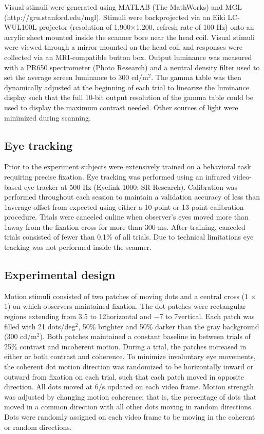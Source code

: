 \documentclass{report}
\begin{document}
Visual stimuli were generated using MATLAB (The MathWorks) and MGL \citep{Gardner2018-uq} (http://gru.stanford.edu/mgl). Stimuli were backprojected via an Eiki LC-WUL100L projector (resolution of 1,900×1,200, refresh rate of 100 Hz) onto an acrylic sheet mounted inside the scanner bore near the head coil. Visual stimuli were viewed through a mirror mounted on the head coil and responses were collected via an MRI-compatible button box. Output luminance was measured with a PR650 spectrometer (Photo Research) and a neutral density filter used to set the average screen luminance to 300 cd/m$^2$. The gamma table was then dynamically adjusted at the beginning of each trial to linearize the luminance display such that the full 10-bit output resolution of the gamma table could be used to display the maximum contrast needed. Other sources of light were minimized during scanning.

\subsection{Eye tracking}

Prior to the experiment subjects were extensively trained on a behavioral task requiring precise fixation. Eye tracking was performed using an infrared video-based eye-tracker at 500 Hz (Eyelink 1000; SR Research). Calibration was performed throughout each session to maintain a validation accuracy of less than 1\degree  average offset from expected using either a 10-point or 13-point calibration procedure. Trials were canceled online when observer’s eyes moved more than 1\degree  away from the fixation cross for more than 300 ms. After training, canceled trials consisted of fewer than 0.1\% of all trials. Due to technical limitations eye tracking was not performed inside the scanner.

\subsection{Experimental design}

Motion stimuli consisted of two patches of moving dots and a central cross (1 $\times$ 1\degree) on which observers maintained fixation. The dot patches were rectangular regions extending from 3.5 to 12\degree horizontal and −7 to 7\degree vertical. Each patch was filled with 21 dots/deg$^2$, 50\% brighter and 50\% darker than the gray background (300 cd/m$^2$). Both patches maintained a constant baseline in between trials of 25\% contrast and incoherent motion. During a trial, the patches increased in either or both contrast and coherence. To minimize involuntary eye movements, the coherent dot motion direction was randomized to be horizontally inward or outward from fixation on each trial, such that each patch moved in opposite direction. All dots moved at 6\degree /s updated on each video frame. Motion strength was adjusted by changing motion coherence; that is, the percentage of dots that moved in a common direction with all other dots moving in random directions. Dots were randomly assigned on each video frame to be moving in the coherent or random directions.
\end{document}
